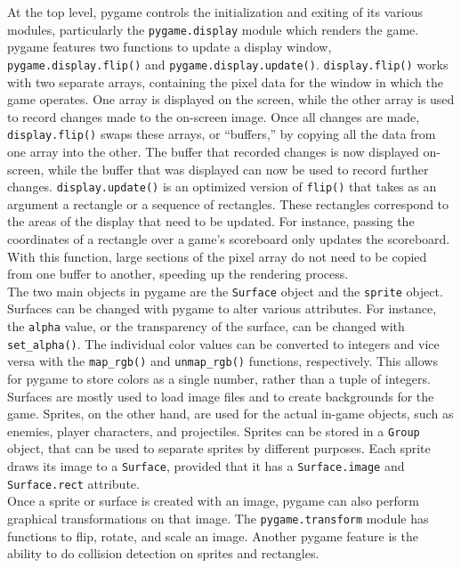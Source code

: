 At the top level, pygame controls the initialization and exiting of its various modules, particularly the \texttt{pygame.display} module which renders the game. pygame features two functions to update a display window, \texttt{pygame.display.flip()} and \texttt{pygame.display.update()}. \texttt{display.flip()} works with two separate arrays, containing the pixel data for the window in which the game operates. One array is displayed on the screen, while the other array is used to record changes made to the on-screen image. Once all changes are made, \texttt{display.flip()} swaps these arrays, or ``buffers,'' by copying all the data from one array into the other. The buffer that recorded changes is now displayed on-screen, while the buffer that was displayed can now be used to record further changes. \texttt{display.update()} is an optimized version of \texttt{flip()} that takes as an argument a rectangle or a sequence of rectangles. These rectangles correspond to the areas of the display that need to be updated. For instance, passing the coordinates of a rectangle over a game's scoreboard only updates the scoreboard. With this function, large sections of the pixel array do not need to be copied from one buffer to another, speeding up the rendering process.\\

The two main objects in pygame are the \texttt{Surface} object and the \texttt{sprite} object. Surfaces can be changed with pygame to alter various attributes. For instance, the \texttt{alpha} value, or the transparency of the surface, can be changed with \texttt{set\_alpha()}. The individual color values can be converted to integers and vice versa with the \texttt{map\_rgb()} and \texttt{unmap\_rgb()} functions, respectively. This allows for pygame to store colors as a single number, rather than a tuple of integers. Surfaces are mostly used to load image files and to create backgrounds for the game. Sprites, on the other hand, are used for the actual in-game objects, such as enemies, player characters, and projectiles. Sprites can be stored in a \texttt{Group} object, that can be used to separate sprites by different purposes. Each sprite draws its image to a \texttt{Surface}, provided that it has a \texttt{Surface.image} and \texttt{Surface.rect} attribute.\\

Once a sprite or surface is created with an image, pygame can also perform graphical transformations on that image. The \texttt{pygame.transform} module has functions to flip, rotate, and scale an image. Another pygame feature is the ability to do collision detection on sprites and rectangles.\\

